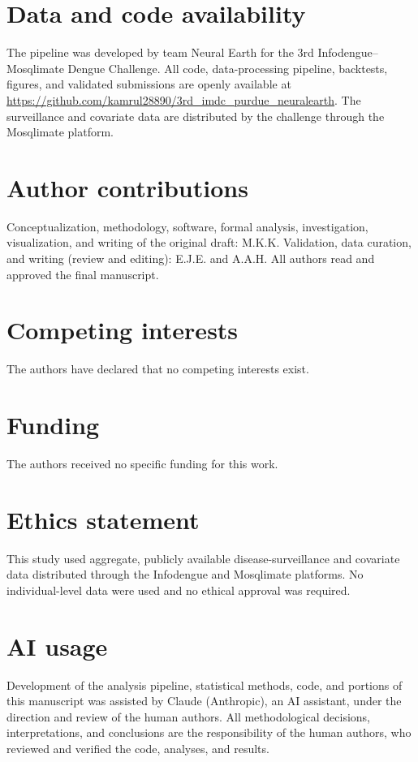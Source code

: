 \documentclass[11pt]{article}
\begin{document}
\section*{Data and code availability}
The pipeline was developed by team Neural Earth for the 3rd Infodengue--Mosqlimate Dengue Challenge.
All code, data-processing pipeline, backtests, figures, and validated submissions are openly available
at \url{https://github.com/kamrul28890/3rd_imdc_purdue_neuralearth}. The surveillance and covariate
data are distributed by the challenge through the Mosqlimate platform.

\section*{Author contributions}
Conceptualization, methodology, software, formal analysis, investigation, visualization, and writing
of the original draft: M.K.K. Validation, data curation, and writing (review and editing): E.J.E. and
A.A.H. All authors read and approved the final manuscript.

\section*{Competing interests}
The authors have declared that no competing interests exist.

\section*{Funding}
The authors received no specific funding for this work.

\section*{Ethics statement}
This study used aggregate, publicly available disease-surveillance and covariate data distributed
through the Infodengue and Mosqlimate platforms. No individual-level data were used and no ethical
approval was required.

\section*{AI usage}
Development of the analysis pipeline, statistical methods, code, and portions of this manuscript
was assisted by Claude (Anthropic), an AI assistant, under the direction and review of the human
authors. All methodological decisions, interpretations, and conclusions are the responsibility of
the human authors, who reviewed and verified the code, analyses, and results.
\end{document}
